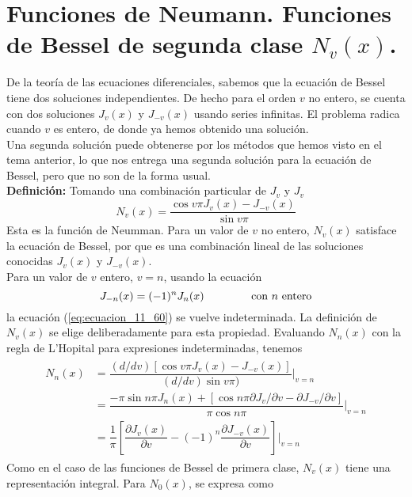 \section{Funciones de Neumann. Funciones de Bessel de segunda clase $N_{v}(x)$.}
De la teoría de las ecuaciones diferenciales, sabemos que la ecuación de Bessel tiene dos soluciones independientes. De hecho para el orden $v$ no entero, se cuenta con dos soluciones $J_{v}(x)$ y $J_{-v}(x)$ usando series infinitas. El problema radica cuando $v$ es entero, de donde ya hemos obtenido una solución.
\\
Una segunda solución puede obtenerse por los métodos que hemos visto en el tema anterior, lo que nos entrega una segunda solución para la ecuación de Bessel, pero que no son de la forma usual.
\\
\textbf{Definición:}
Tomando una combinación particular de $J_{v}$ y $J_{v}$
\begin{equation}
N_{v} (x) = \dfrac{\cos v \pi J_{v}(x) - J_{-v} (x)}{\sin v \pi}
\label{eq:ecuacion_11_60}
\end{equation}
Esta es la función de Neumman. Para un valor de $v$ no entero, $N_{v}(x)$ satisface la ecuación de Bessel, por que es una combinación lineal de las soluciones conocidas $J_{v}(x)$ y $J_{-v}(x)$.
\\
Para un valor de $v$ entero, $v=n$, usando la ecuación
\begin{equation}
J_{-n}(x) = (-1)^{n} J_{n}(x) \hspace{1.5cm} \text{con $n$ entero}
\label{eq:ecuacion_11_8}
\end{equation}
la ecuación (\ref{eq:ecuacion_11_60}) se vuelve indeterminada. La definición de $N_{v}(x)$ se elige deliberadamente para esta propiedad. Evaluando $N_{n}(x)$ con la regla de L'Hopital para expresiones indeterminadas, tenemos
\begin{eqnarray}
\begin{aligned}
N_{n}(x) &= \dfrac{(d/d v)[\cos v \pi J_{v}(x) - J_{-v}(x)]}{(d/dv) \sin v \pi)} \bigg\vert_{v=n} \\
&= \dfrac{-\pi \sin n \pi J_{n}(x) + [\cos n \pi \partial J_{v} / \partial v - \partial J_{-v} / \partial v]}{\pi \cos n \pi} \bigg\vert_{v=n} \\
&= \dfrac{1}{\pi} \left[ \dfrac{\partial J_{v}(x)}{\partial v} - (-1)^{n} \dfrac{\partial J_{-v}(x)}{\partial v} \right] \bigg\vert_{v=n}
\end{aligned}
\label{eq:ecuacion_11_61}
\end{eqnarray}
Como en el caso de las funciones de Bessel de primera clase, $N_{v}(x)$ tiene una representación integral. Para $N_{0}(x)$, se expresa como

